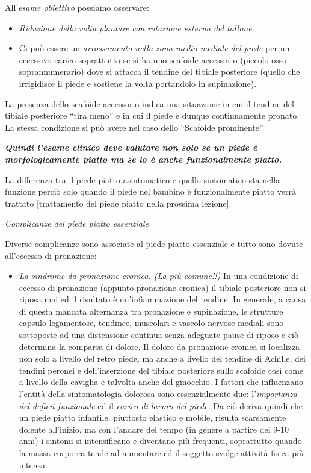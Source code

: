 \documentclass[]{article}
\begin{document}
All'\emph{esame obiettivo} possiamo osservare:

\begin{itemize}
\item
  \emph{Riduzione della volta plantare con rotazione esterna del
  tallone.}
\item
  Ci può essere un \emph{arrossamento nella zona medio-mediale del
  piede} per un eccessivo carico soprattutto se si ha uno scafoide
  accessorio (piccolo osso soprannumerario) dove si attacca il tendine
  del tibiale posteriore (quello che irrigidisce il piede e sostiene la
  volta portandolo in supinazione).
\end{itemize}

La presenza dello scafoide accessorio indica una situazione in cui il
tendine del tibiale posteriore ``tira meno'' e in cui il piede è dunque
continuamente pronato. La stessa condizione si può avere nel caso dello
``Scafoide prominente''.

\textbf{\emph{Quindi l'esame clinico deve valutare non solo se un piede
è morfologicamente piatto ma se lo è anche funzionalmente piatto.}}

La differenza tra il piede piatto asintomatico e quello sintomatico sta
nella funzione perciò solo quando il piede nel bambino è funzionalmente
piatto verrà trattato {[}trattamento del piede piatto nella prossima
lezione{]}.

\emph{Complicanze del piede piatto essenziale}

Diverse complicanze sono associate al piede piatto essenziale e tutto
sono dovute all'eccesso di pronazione:

\begin{itemize}
\item
  \emph{La sindrome da pronazione cronica. (La più comune!!)} In una
  condizione di eccesso di pronazione (appunto pronazione cronica) il
  tibiale posteriore non si riposa mai ed il risultato è
  un'infiammazione del tendine. In generale, a causa di questa mancata
  alternanza tra pronazione e supinazione, le strutture
  capsulo-legamentose, tendinee, muscolari e vascolo-nervose mediali
  sono sottoposte ad una distensione continua senza adeguate pause di
  riposo e ciò determina la comparsa di dolore. Il dolore da pronazione
  cronica si localizza non solo a livello del retro piede, ma anche a
  livello del tendine di Achille, dei tendini peronei e dell'inserzione
  del tibiale posteriore sullo scafoide così come a livello della
  caviglia e talvolta anche del ginocchio. I fattori che influenzano
  l'entità della sintomatologia dolorosa sono essenzialmente due:
  l'\emph{importanza del deficit funzionale} ed il \emph{carico di
  lavoro del piede}. Da ciò deriva quindi che un piede piatto infantile,
  piuttosto elastico e mobile, risulta scarsamente dolente all'inizio,
  ma con l'andare del tempo (in genere a partire dei 9-10 anni) i
  sintomi si intensificano e diventano più frequenti, soprattutto quando
  la massa corporea tende ad aumentare ed il soggetto svolge attività
  fisica più intensa.
\end{itemize}
\end{document}
